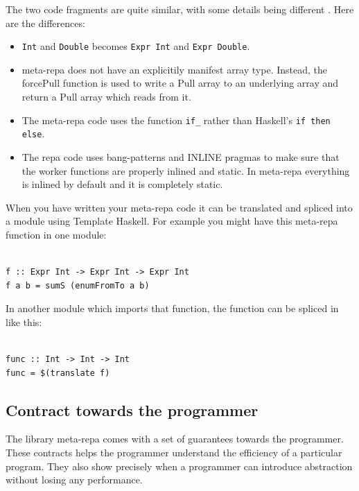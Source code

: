 \documentclass[preprint]{sigplanconf}
\begin{document}
The two code fragments are quite similar, with some details being
different . Here are the differences:

\begin{itemize}
\itemsep1pt\parskip0pt
\item
  \texttt{Int} and \texttt{Double} becomes \texttt{Expr Int} and
  \texttt{Expr Double}.
\item
  meta-repa does not have an explicitily manifest array type. Instead,
  the forcePull function is used to write a Pull array to an underlying
  array and return a Pull array which reads from it.
\item
  The meta-repa code uses the function \texttt{if\_} rather than
  Haskell's \texttt{if then else}.
\item
  The repa code uses bang-patterns and INLINE pragmas to make sure that
  the worker functions are properly inlined and static. In meta-repa
  everything is inlined by default and it is completely static.
\end{itemize}

When you have written your meta-repa code it can be translated and
spliced into a module using Template Haskell. For example you might have
this meta-repa function in one module:

\begin{verbatim}

f :: Expr Int -> Expr Int -> Expr Int
f a b = sumS (enumFromTo a b)
\end{verbatim}

In another module which imports that function, the function can be
spliced in like this:

\begin{verbatim}

func :: Int -> Int -> Int
func = $(translate f)
\end{verbatim}

\subsection{Contract towards the programmer}

The library meta-repa comes with a set of guarantees towards the
programmer. These contracts helps the programmer understand the
efficiency of a particular program. They also show precisely when a
programmer can introduce abstraction without losing any performance.
\end{document}
